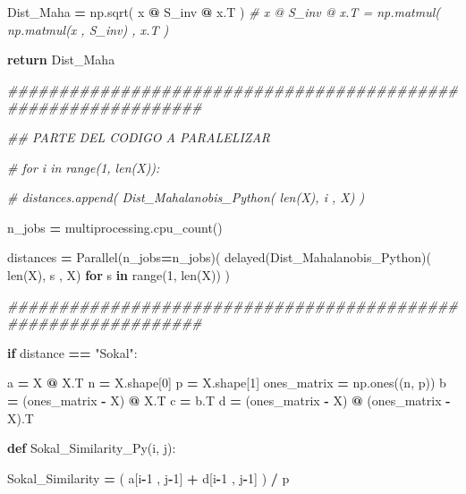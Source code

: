 \documentclass[
  11pt,
  a4paper,
]{article}
\newenvironment{Shaded}{\begin{snugshade}}{\end{snugshade}}
\newcommand{\BuiltInTok}[1]{#1}
\newcommand{\CommentTok}[1]{\textcolor[rgb]{0.56,0.35,0.01}{\textit{#1}}}
\newcommand{\ControlFlowTok}[1]{\textcolor[rgb]{0.13,0.29,0.53}{\textbf{#1}}}
\newcommand{\DecValTok}[1]{\textcolor[rgb]{0.00,0.00,0.81}{#1}}
\newcommand{\KeywordTok}[1]{\textcolor[rgb]{0.13,0.29,0.53}{\textbf{#1}}}
\newcommand{\NormalTok}[1]{#1}
\newcommand{\OperatorTok}[1]{\textcolor[rgb]{0.81,0.36,0.00}{\textbf{#1}}}
\newcommand{\StringTok}[1]{\textcolor[rgb]{0.31,0.60,0.02}{#1}}
\begin{document}
\begin{Shaded}
\begin{Highlighting}[]
\NormalTok{            Dist\_Maha }\OperatorTok{=}\NormalTok{ np.sqrt( x }\OperatorTok{@}\NormalTok{ S\_inv }\OperatorTok{@}\NormalTok{ x.T )  }\CommentTok{\# x @ S\_inv @ x.T = np.matmul( np.matmul(x , S\_inv) , x.T )}

            

            \ControlFlowTok{return}\NormalTok{ Dist\_Maha}

        
\CommentTok{\#\#\#\#\#\#\#\#\#\#\#\#\#\#\#\#\#\#\#\#\#\#\#\#\#\#\#\#\#\#\#\#\#\#\#\#\#\#\#\#\#\#\#\#\#\#\#\#\#\#\#\#\#\#\#\#\#\#\#\#\#\#\#}

    \CommentTok{\#\# PARTE DEL CODIGO A PARALELIZAR}

       \CommentTok{\# for i in range(1, len(X)):}

        \CommentTok{\#    distances.append( Dist\_Mahalanobis\_Python( len(X), i , X) )}

\NormalTok{        n\_jobs  }\OperatorTok{=}\NormalTok{ multiprocessing.cpu\_count()}

\NormalTok{        distances }\OperatorTok{=}\NormalTok{ Parallel(n\_jobs}\OperatorTok{=}\NormalTok{n\_jobs)( delayed(Dist\_Mahalanobis\_Python)( }\BuiltInTok{len}\NormalTok{(X), s , X) }\ControlFlowTok{for}\NormalTok{ s }\KeywordTok{in} \BuiltInTok{range}\NormalTok{(}\DecValTok{1}\NormalTok{, }\BuiltInTok{len}\NormalTok{(X)) )}
       

\CommentTok{\#\#\#\#\#\#\#\#\#\#\#\#\#\#\#\#\#\#\#\#\#\#\#\#\#\#\#\#\#\#\#\#\#\#\#\#\#\#\#\#\#\#\#\#\#\#\#\#\#\#\#\#\#\#\#\#\#\#\#\#\#\#\#}
    
    \ControlFlowTok{if}\NormalTok{ distance }\OperatorTok{==} \StringTok{"Sokal"}\NormalTok{:}

\NormalTok{        a }\OperatorTok{=}\NormalTok{ X }\OperatorTok{@}\NormalTok{ X.T}
\NormalTok{        n }\OperatorTok{=}\NormalTok{ X.shape[}\DecValTok{0}\NormalTok{]}
\NormalTok{        p }\OperatorTok{=}\NormalTok{ X.shape[}\DecValTok{1}\NormalTok{]}
\NormalTok{        ones\_matrix }\OperatorTok{=}\NormalTok{ np.ones((n, p))}
\NormalTok{        b }\OperatorTok{=}\NormalTok{ (ones\_matrix }\OperatorTok{{-}}\NormalTok{ X) }\OperatorTok{@}\NormalTok{ X.T}
\NormalTok{        c }\OperatorTok{=}\NormalTok{ b.T}
\NormalTok{        d }\OperatorTok{=}\NormalTok{ (ones\_matrix }\OperatorTok{{-}}\NormalTok{ X) }\OperatorTok{@}\NormalTok{ (ones\_matrix }\OperatorTok{{-}}\NormalTok{ X).T}


        \KeywordTok{def}\NormalTok{ Sokal\_Similarity\_Py(i, j):}

\NormalTok{            Sokal\_Similarity }\OperatorTok{=}\NormalTok{ ( a[i}\OperatorTok{{-}}\DecValTok{1}\NormalTok{ , j}\OperatorTok{{-}}\DecValTok{1}\NormalTok{] }\OperatorTok{+}\NormalTok{ d[i}\OperatorTok{{-}}\DecValTok{1}\NormalTok{ , j}\OperatorTok{{-}}\DecValTok{1}\NormalTok{] ) }\OperatorTok{/}\NormalTok{ p}


\end{Highlighting}
\end{Shaded}
\end{document}
